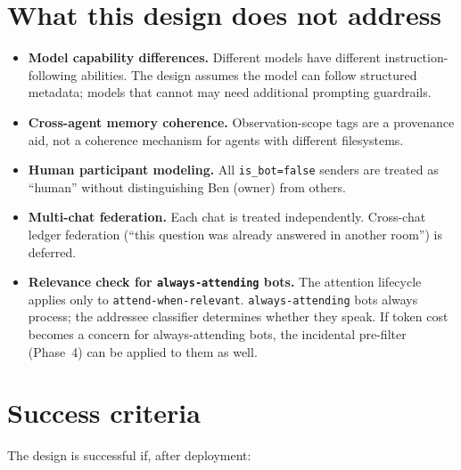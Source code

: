 \documentclass[11pt]{article}
\begin{document}
\section{What this design does not address}

\begin{itemize}
\item \textbf{Model capability differences.}  Different models have different
instruction-following abilities.  The design assumes the model can follow
structured metadata; models that cannot may need additional prompting
guardrails.
\item \textbf{Cross-agent memory coherence.}  Observation-scope tags are a
provenance aid, not a coherence mechanism for agents with different
filesystems.
\item \textbf{Human participant modeling.}  All \texttt{is\_bot=false} senders
are treated as ``human'' without distinguishing Ben (owner) from others.
\item \textbf{Multi-chat federation.}  Each chat is treated independently.
Cross-chat ledger federation (``this question was already answered in another
room'') is deferred.
\item \textbf{Relevance check for \texttt{always-attending} bots.}  The
attention lifecycle applies only to \texttt{attend-when-relevant}.
\texttt{always-attending} bots always process; the addressee classifier
determines whether they speak.  If token cost becomes a concern for
always-attending bots, the incidental pre-filter (Phase~4) can be applied to
them as well.
\end{itemize}

\section{Success criteria}

The design is successful if, after deployment:
\end{document}
